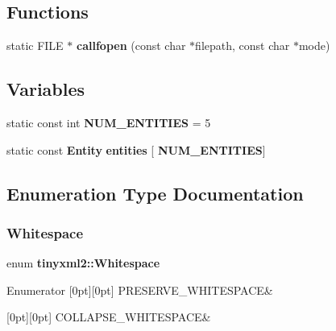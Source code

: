 \subsection*{Functions}
\begin{DoxyCompactItemize}
\item 
static F\+I\+LE $\ast$ \textbf{ callfopen} (const char $\ast$filepath, const char $\ast$mode)
\end{DoxyCompactItemize}
\subsection*{Variables}
\begin{DoxyCompactItemize}
\item 
static const int \textbf{ N\+U\+M\+\_\+\+E\+N\+T\+I\+T\+I\+ES} = 5
\item 
static const \textbf{ Entity} \textbf{ entities} [\textbf{ N\+U\+M\+\_\+\+E\+N\+T\+I\+T\+I\+ES}]
\end{DoxyCompactItemize}


\subsection{Enumeration Type Documentation}
\mbox{\label{namespacetinyxml2_a7f91d00f77360f850fd5da0861e27dd5}} 
\subsubsection{Whitespace}
{\footnotesize\ttfamily enum \textbf{ tinyxml2\+::\+Whitespace}}

\begin{DoxyEnumFields}{Enumerator}
[0pt][0pt]{}\mbox{\label{namespacetinyxml2_a7f91d00f77360f850fd5da0861e27dd5a751769aa625fe5fe5286e9779edec56a}} 
P\+R\+E\+S\+E\+R\+V\+E\+\_\+\+W\+H\+I\+T\+E\+S\+P\+A\+CE&\\
\hline

[0pt][0pt]{}\mbox{\label{namespacetinyxml2_a7f91d00f77360f850fd5da0861e27dd5a9a4a309029a6f5e636e20ef5e0b65136}} 
C\+O\+L\+L\+A\+P\+S\+E\+\_\+\+W\+H\+I\+T\+E\+S\+P\+A\+CE&\\
\hline

\end{DoxyEnumFields}


